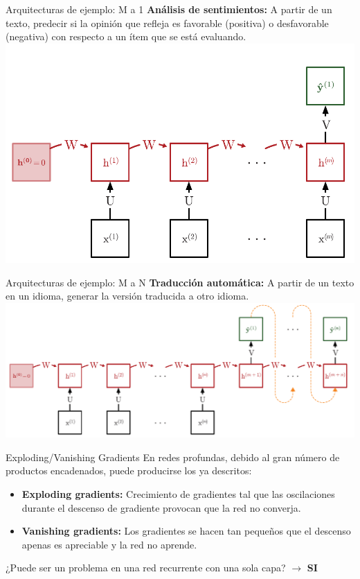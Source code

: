 \documentclass[aspectratio=169]{beamer}
\begin{document}
\begin{frame}[t]{Arquitecturas de ejemplo: M a 1}
	\textbf{Análisis de sentimientos:} A partir de un texto, predecir si la opinión que refleja es favorable (positiva) o desfavorable (negativa) con respecto a un ítem que se está evaluando.\\
	\vspace{.3cm}
	\includegraphics[width=.55\textwidth, center]{imgs/tema4/rnn/MM1.pdf}
\end{frame}

\begin{frame}[t]{Arquitecturas de ejemplo: M a N}
	\textbf{Traducción automática:} A partir de un texto en un idioma, generar la versión traducida a otro idioma.\\
	\vspace{.3cm}
	\includegraphics[width=.9\textwidth, center]{imgs/tema4/rnn/MMN.pdf}
\end{frame}

\begin{frame}{Exploding/Vanishing Gradients}
	En redes profundas, debido al gran número de productos encadenados, puede producirse los ya descritos:
	\begin{itemize}
		\item \textbf{Exploding gradients:} Crecimiento de gradientes tal que las oscilaciones durante el descenso de gradiente provocan que la red no converja.
		\item \textbf{Vanishing gradients:} Los gradientes se hacen tan pequeños que el descenso apenas es apreciable y la red no aprende.
	\end{itemize}
	\begin{block}{}
		\centering
		¿Puede ser un problema en una red recurrente con una sola capa? $\rightarrow$ {\color{red}\textbf{SI}}
	\end{block}
\end{frame}
\end{document}
